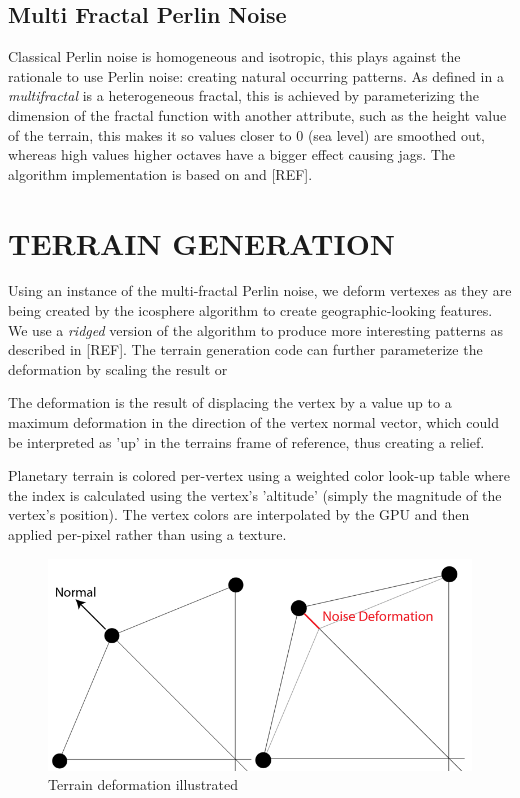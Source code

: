 \documentclass[a4paper,twoside]{article}
\begin{document}
\subsection{Multi Fractal Perlin Noise}
\label{sec:mfpnois}
Classical Perlin noise is homogeneous and isotropic, this plays against the rationale to use Perlin noise: creating natural occurring patterns.  As defined in \cite{ondrej07} a \textit{multifractal} is a heterogeneous fractal, this is achieved by parameterizing the dimension of the fractal function with another attribute, such as the height value of the terrain, this makes it so values closer to 0 (sea level) are smoothed out, whereas high values higher octaves have a bigger effect causing jags.  The algorithm implementation is based on \cite{pnoise} and [REF].

\section{\uppercase{Terrain Generation}}
\label{sec:tgeneration}

\noindent Using an instance of the multi-fractal Perlin noise, we deform vertexes as they are being created by the icosphere algorithm to create geographic-looking features. We use a \textit{ridged} version of the algorithm to produce more interesting patterns as described in [REF]. The terrain generation code can further parameterize the deformation by scaling the result or 

The deformation is the result of displacing the vertex by a value up to a maximum deformation in the direction of the vertex normal vector, which could be interpreted as 'up' in the terrains frame of reference, thus creating a relief.

Planetary terrain is colored per-vertex using a weighted color look-up table where the index is calculated using the vertex's 'altitude' (simply the magnitude of the vertex's position). The vertex colors are interpolated by the GPU and then applied per-pixel rather than using a texture.

\begin{figure}
\centering
\includegraphics[scale=0.25]{./images/normals_deformation.png}
\caption{Terrain deformation illustrated}
\label{fig_tda}
\end{figure}
\end{document}
